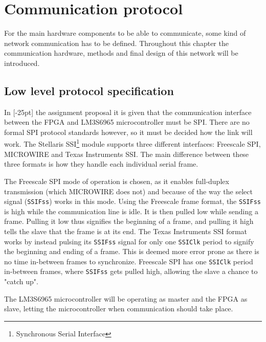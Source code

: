 \chapter{Communication protocol}\label{chap:comm}
For the main hardware components to be able to communicate, some kind of network communication has to be defined. Throughout this chapter the communication hardware, methods and final design of this network will be introduced.


\section{Low level protocol specification}
In [-25pt] the assignment proposal it is given that the communication interface between the FPGA and LM3S6965 microcontroller must be SPI. There are no formal SPI protocol standards however, so it must be decided how the link will work. The Stellaris SSI\footnote{Synchronous Serial Interface} module supports three different interfaces: Freescale SPI, MICROWIRE and Texas Instruments SSI. The main difference between these three formats is how they handle each individual serial frame.

The Freescale SPI mode of operation is chosen, as it enables full-duplex transmission (which MICROWIRE does not) and because of the way the select signal (\texttt{SSIFss}) works in this mode. Using the Freescale frame format, the \texttt{SSIFss} is high while the communication line is idle.  It is then pulled low while sending a frame. Pulling it low thus signifies the beginning of a frame, and pulling it high tells the slave that the frame is at its end. The Texas Instruments SSI format works by instead pulsing its \texttt{SSIFss} signal for only one \texttt{SSIClk} period to signify the beginning and ending of a frame. This is deemed more error prone as there is no time in-between frames to synchronize. Freescale SPI has one \texttt{SSIClk} period in-between frames, where \texttt{SSIFss} gets pulled high, allowing the slave a chance to "catch up".

The LM3S6965 microcontroller will be operating as master and the FPGA as slave, letting the microcontroller when communication should take place.

